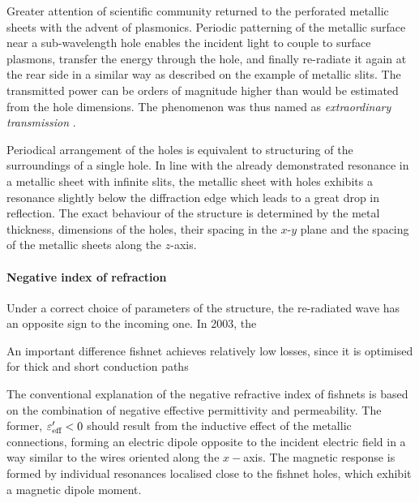 {Greater attention of scientific community returned to the perforated metallic sheets with the advent of plasmonics. Periodic patterning of the metallic surface near a sub-wavelength hole enables the incident light to couple to surface plasmons, transfer the energy through the hole, and finally re-radiate it again at the rear side in a similar way as described on the example of metallic slits. 
The transmitted power can be orders of magnitude higher than would be estimated from the hole dimensions.  %
The phenomenon was thus named as \textit{extraordinary transmission} \cite{ebbesen1998extraordinary}.

Periodical arrangement of the holes is equivalent to structuring of the surroundings of a single hole. In line with the already demonstrated resonance in a metallic sheet with infinite slits, the metallic sheet with holes exhibits a resonance slightly below the diffraction edge which leads to a great drop in reflection. The exact behaviour of the structure is determined by the  metal thickness, dimensions of the holes, their spacing in the $x$-$y$ plane and the spacing of the metallic sheets along the $z$-axis.

\paragraph{Negative index of refraction}%
Under a correct choice of parameters of the structure, the re-radiated wave has an opposite sign to the incoming one. In 2003, the %



An important difference  fishnet achieves relatively low losses, since it is optimised for thick and short conduction paths 

The conventional explanation of the negative refractive index of fishnets is based on the combination of negative effective permittivity and permeability. The former, $\varepsilon_{\text{eff} }'<0$ should result from the inductive effect of the metallic connections, forming an electric dipole opposite to the incident electric field in a way similar to the wires oriented along the $x-$axis.  
The magnetic response is formed by individual resonances localised close to the fishnet holes, which exhibit a magnetic dipole moment.

}
